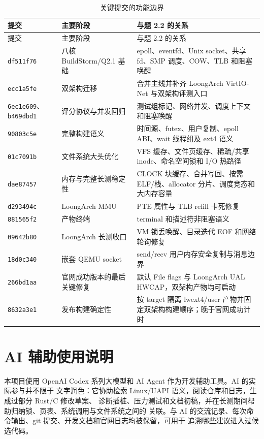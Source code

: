 \documentclass[UTF8,zihao=-4]{ctexart}
\newcommand{\code}{\nolinkurl}
\begin{document}
\begin{longtable}{p{}p{}p{}}
\caption{关键提交的功能边界}\label{tab:commits}\\
\toprule
提交 & 主要阶段 & 与题 2.2 的关系 \\
\midrule
\endfirsthead
\toprule
提交 & 主要阶段 & 与题 2.2 的关系 \\
\midrule
\endhead
\code{df511f76} & 八核 BuildStorm/Q2.1 基础 & epoll、eventfd、Unix socket、共享 fd、SMP 调度、COW、TLB 和阻塞唤醒 \\
\code{ecc1a5fe} & 双架构迁移 & 合并主线并补齐 LoongArch VirtIO-Net 与双架构评测入口 \\
\code{6ec1e609}、\code{b469dbd1} & 评分协议与并发回归 & 测试组标记、网络并发、调度上下文和阻塞唤醒 \\
\code{90803c5e} & 完整构建语义 & 时间源、futex、用户复制、epoll ABI、wait 线程组及 ext4 语义 \\
\code{01c7091b} & 文件系统大头优化 & VFS 缓存、文件页缓存、稀疏/共享 inode、命名空间锁和 I/O 热路径 \\
\code{dae87457} & 内存与完整长测稳定性 & CLOCK 块缓存、合并写回、按需 ELF/栈、allocator 分片、调度竞态和大内存容量 \\
\code{d293494c} & LoongArch MMU & PTE 属性与 TLB refill 卡死修复 \\
\code{881565f2} & 产物终端 & terminal 和描述符非阻塞语义 \\
\code{09642b80} & LoongArch 长测收口 & VM 锁丢唤醒、目录迭代 EOF 和网络轮询修复 \\
\code{18d0c340} & 嵌套 QEMU socket & send/recv 用户内存安全复制与消息边界 \\
\code{266bd1aa} & 官网成功版本的最后关键修复 & 默认 File flags 与 LoongArch UAL HWCAP，双架构产物均可启动 \\
\code{8632a3e1} & 发布构建确定性 & 按 target 隔离 lwext4/user 产物并固定双架构构建顺序；晚于官网成功计时 \\
\bottomrule
\end{longtable}

\section{AI 辅助使用说明}
\label{sec:ai}

本项目使用 OpenAI Codex 系列大模型和 AI Agent 作为开发辅助工具。AI 的实际参与并不限于
文字润色：它协助检索 Linux/UAPI 语义，阅读仓库和日志，生成过部分 Rust/C 修改草案、
诊断插桩、压力测试和文档初稿，并在长测期间帮助归纳锁、页表、系统调用与文件系统之间的
关联。与 AI 的交流记录、每次命令输出、git 提交、开发文档和官网日志均被保留，可用于
追溯哪些建议进入过候选代码。
\end{document}
